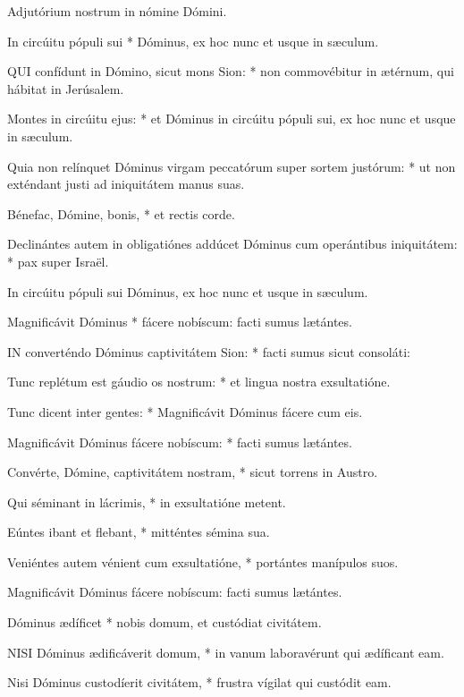  Adjutórium nostrum in nómine Dómini.

 In circúitu pópuli sui * Dóminus, ex hoc nunc et usque in sæculum.


\lettrine[lines=2]{Q}{UI} confídunt in Dómino, sicut mons Sion: * non commovébitur in ætérnum, qui hábitat in Jerúsalem.

Montes in circúitu ejus: * et Dóminus in circúitu pópuli sui, ex hoc nunc et usque in sæculum.

Quia non relínquet Dóminus virgam peccatórum super sortem justórum: * ut non exténdant justi ad iniquitátem manus suas.

Bénefac, Dómine, bonis, * et rectis corde.

Declinántes autem in obligatiónes addúcet Dóminus cum operántibus iniquitátem: * pax super Israël.

 In circúitu pópuli sui Dóminus, ex hoc nunc et usque in sæculum.

 Magnificávit Dóminus * fácere nobíscum: facti sumus lætántes.


\lettrine[lines=2]{I}{N} converténdo Dóminus captivitátem Sion: * facti sumus sicut consoláti:

Tunc replétum est gáudio os nostrum: * et lingua nostra exsultatióne.

Tunc dicent inter gentes: * Magnificávit Dóminus fácere cum eis.

Magnificávit Dóminus fácere nobíscum: * facti sumus lætántes.

Convérte, Dómine, captivitátem nostram, * sicut torrens in Austro.

Qui séminant in lácrimis, * in exsultatióne metent.

Eúntes ibant et flebant, * mitténtes sémina sua.

Veniéntes autem vénient cum exsultatióne, * portántes manípulos suos.

 Magnificávit Dóminus fácere nobíscum: facti sumus lætántes.

 Dóminus ædíficet * nobis domum, et custódiat civitátem.


\lettrine[lines=2]{N}{ISI} Dóminus ædificáverit domum, * in vanum laboravérunt qui ædíficant eam.

Nisi Dóminus custodíerit civitátem, * frustra vígilat qui custódit eam.

